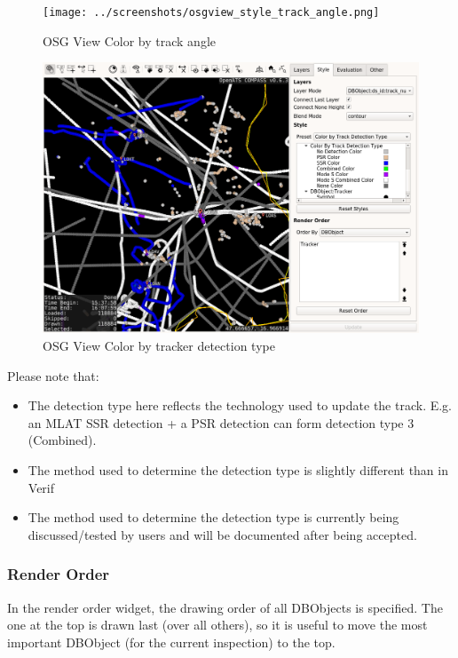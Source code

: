 \begin{figure}[H]
    \hspace*{-2.5cm}
    \texttt{[image: ../screenshots/osgview\_style\_track\_angle.png]}
  \caption{OSG View Color by track angle}
\end{figure}

\begin{figure}[H]
    \hspace*{-2.5cm}
    \includegraphics[width=19cm,frame]{../screenshots/osgview_style_tracker_detection_type.png}
  \caption{OSG View Color by tracker detection type}
\end{figure}

Please note that:
\begin{itemize}
 \item The detection type here reflects the technology used to update the track. E.g. an MLAT SSR detection + a PSR detection can form detection type 3 (Combined).
 \item The method used to determine the detection type is slightly different than in Verif
 \item The method used to determine the detection type is currently being discussed/tested by users and will be documented after being accepted.
\end{itemize}

\subsubsection{Render Order}

In the render order widget, the drawing order of all DBObjects is specified. The one at the top is drawn last (over all others), so it is useful to move the most important DBObject (for the current inspection) to the top.

